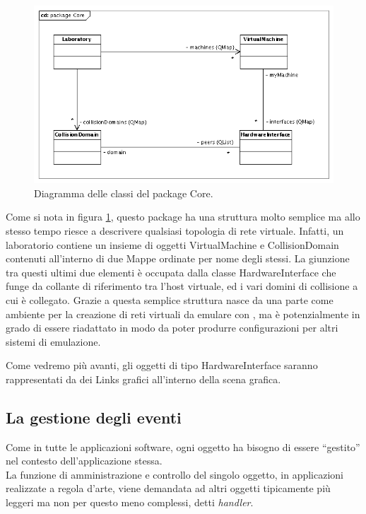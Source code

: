 \begin{figure}[!htb]
	\centering
	\includegraphics[width=12cm]{images/uml_package_core.png}
	\caption{Diagramma delle classi del package Core.}
	\label{figura:uml_package_core}
\end{figure}

Come si nota in figura \ref{figura:uml_package_core}, questo package ha una struttura molto semplice ma allo stesso tempo riesce a descrivere qualsiasi topologia di rete virtuale. Infatti, un laboratorio contiene un insieme di oggetti VirtualMachine e CollisionDomain contenuti all'interno di due Mappe ordinate per nome degli stessi. La giunzione tra questi ultimi due elementi è occupata dalla classe HardwareInterface che funge da collante di riferimento tra l'host virtuale, ed i vari domini di collisione a cui è collegato.
Grazie a questa semplice struttura \visualnetkit{} nasce da una parte come ambiente per la creazione di reti virtuali da emulare con \netkit{}, ma è potenzialmente in grado di essere riadattato in modo da poter produrre configurazioni per altri sistemi di emulazione.

Come vedremo più avanti, gli oggetti di tipo HardwareInterface saranno rappresentati da dei Links grafici all'interno della scena grafica.

\subsection{La gestione degli eventi}
Come in tutte le applicazioni software, ogni oggetto ha bisogno di essere ``gestito'' nel contesto dell'applicazione stessa.\\
La funzione di amministrazione e controllo del singolo oggetto, in applicazioni realizzate a regola d'arte, viene demandata ad altri oggetti tipicamente più leggeri ma non per questo meno complessi, detti \emph{handler}.

